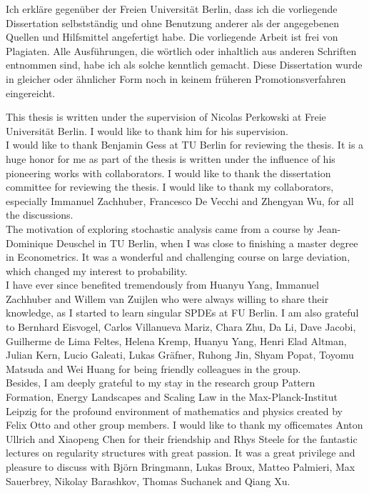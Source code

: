 \begin{originality}

Ich erkläre gegenüber der Freien Universität Berlin, dass ich die vorliegende Dissertation selbstständig und ohne Benutzung anderer als der angegebenen Quellen und Hilfsmittel angefertigt habe. Die vorliegende Arbeit ist frei von Plagiaten. Alle Ausführungen, die wörtlich oder inhaltlich aus anderen Schriften entnommen sind, habe ich als solche kenntlich gemacht. Diese Dissertation wurde in gleicher oder ähnlicher Form noch in keinem früheren Promotionsverfahren eingereicht.

\end{originality}

\begin{acknowledgements}

This thesis is written under the supervision of Nicolas Perkowski at Freie Universität Berlin. I would like to thank him for his supervision.\\

I would like to thank Benjamin Gess at TU Berlin for reviewing the thesis. It is a huge honor for me as part of the thesis is written under the influence of his pioneering works with collaborators. I would like to thank the dissertation committee for reviewing the thesis. I would like to thank my collaborators, especially Immanuel Zachhuber, Francesco De Vecchi and Zhengyan Wu, for all the discussions.\\

The motivation of exploring stochastic analysis came from a course by Jean-Dominique Deuschel in TU Berlin, when I was close to finishing a master degree in Econometrics. It was a wonderful and challenging course on large deviation, which changed my interest to probability. \\

I have ever since benefited tremendously from Huanyu Yang, Immanuel Zachhuber and Willem van Zuijlen who were always willing to share their knowledge, as I started to learn singular SPDEs at FU Berlin. I am also grateful to Bernhard Eisvogel, Carlos Villanueva Mariz, Chara Zhu, Da Li, Dave Jacobi, Guilherme de Lima Feltes, Helena Kremp, Huanyu Yang, Henri Elad Altman, Julian Kern, Lucio Galeati, Lukas Gräfner, Ruhong Jin, Shyam Popat, Toyomu Matsuda and Wei Huang for being friendly colleagues in the group. \\

Besides, I am deeply grateful to my stay in the research group Pattern Formation, Energy Landscapes and Scaling Law in the Max-Planck-Institut Leipzig for the profound environment of mathematics and physics created by Felix Otto and other group members. I would like to thank my officemates Anton Ullrich and Xiaopeng Chen for their friendship and Rhys Steele for the fantastic lectures on regularity structures with great passion. It was a great privilege and pleasure to discuss with Björn Bringmann, Lukas Broux, Matteo Palmieri, Max Sauerbrey, Nikolay Barashkov, Thomas Suchanek and Qiang Xu. \\


\end{acknowledgements}
